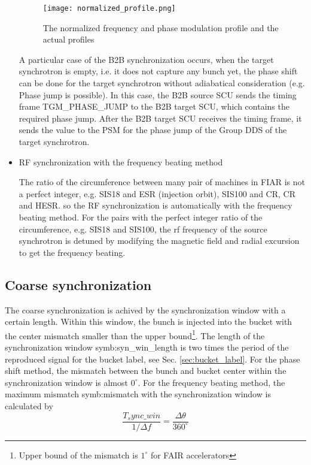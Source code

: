 \begin{itemize}
\begin{figure}[!htb]
   \centering   
   \texttt{[image: normalized\_profile.png]}
   \caption{The normalized frequency and phase modulation profile and the actual profiles}
   \label{normalized_profile}
\end{figure}  

A particular case of the B2B synchronization occurs, when the target synchrotron is empty, i.e. it does not capture any bunch yet, the phase shift can be done for the target synchrotron without adiabatical consideration (e.g. Phase jump is possible). In this case, the B2B source SCU sends the timing frame TGM\_PHASE\_JUMP to the B2B target SCU, which contains the required phase jump. After the B2B target SCU receives the timing frame, it sends the value to the PSM for the phase jump of the Group DDS of the target synchrotron. 

\item RF synchronization with the frequency beating method

The ratio of the circumference between many pair of machines in FIAR is not a perfect integer, e.g. SIS18 and ESR (injection orbit), SIS100 and CR, CR and HESR. so the RF synchronization is automatically with the frequency beating method. For the pairs with the perfect integer ratio of the circumference, e.g. SIS18 and SIS100, the rf frequency of the source synchrotron is detuned by modifying the magnetic field and radial excursion to get the frequency beating.

\end{itemize}


\subsection{Coarse synchronization}

The coarse synchronization is achived by the synchronization window with a certain length. Within this window, the bunch is injected into the bucket with the center mismatch smaller than the upper bound\footnote{Upper bound of the mismatch is $1^\circ$ for FAIR accelerators}. The length of the synchronization window \gls{symb:syn_win_length} is two times the period of the reproduced signal for the bucket label, see Sec. \ref{sec:bucket_label}. For the phase shift method, the mismatch between the bunch and bucket center within the synchronization window is almost $0^\circ$. For the frequency beating method, the maximum mismatch \gls{symb:mismatch} with the synchronization window is calculated by 
\begin{equation}
\frac{T_sync\_win}{1/\Delta f}= \frac{\Delta \theta}{360^\circ}
\end{equation}

